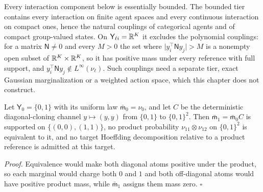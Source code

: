 Every interaction component below is essentially bounded. The bounded tier contains
every interaction on finite agent spaces and every continuous interaction on
compact ones, hence the natural couplings of categorical agents and of compact
group-valued states. On $\mathsf Y_{\ell i}=\mathbb R^K$ it excludes the polynomial
couplings: for a matrix $\mathsf N\ne0$ and every $M>0$ the set where
$\lvert y_i^\top\mathsf Ny_j\rvert>M$ is a nonempty open subset of
$\mathbb R^K\times\mathbb R^K$, so it has positive mass under every reference with full support,
and $y_i^\top\mathsf Ny_j\notin L^\infty(\nu_\ell)$. Such couplings need a separate
tier, exact Gaussian marginalization or a weighted action space, which this
chapter does not construct. 

Let $\mathsf Y_0=\{0,1\}$ with its uniform law $\bar{\mathsf m}_0=\nu_0$, and let
$C$ be the deterministic diagonal-cloning channel $y\mapsto(y,y)$ from $\{0,1\}$ to
$\{0,1\}^2$. Then $\bar{\mathsf m}_1=\bar{\mathsf m}_0C$ is supported on
$\{(0,0),(1,1)\}$, no product probability $\nu_{11}\otimes\nu_{12}$ on
$\{0,1\}^2$ is equivalent to it, and no target Hoeffding decomposition relative to
a product reference is admitted at this target. 

\noindent\emph{Proof.}
Equivalence would make both diagonal atoms positive under the product, so each
marginal would charge both $0$ and $1$ and both off-diagonal atoms would have
positive product mass, while $\bar{\mathsf m}_1$ assigns them mass zero.
$\square$

